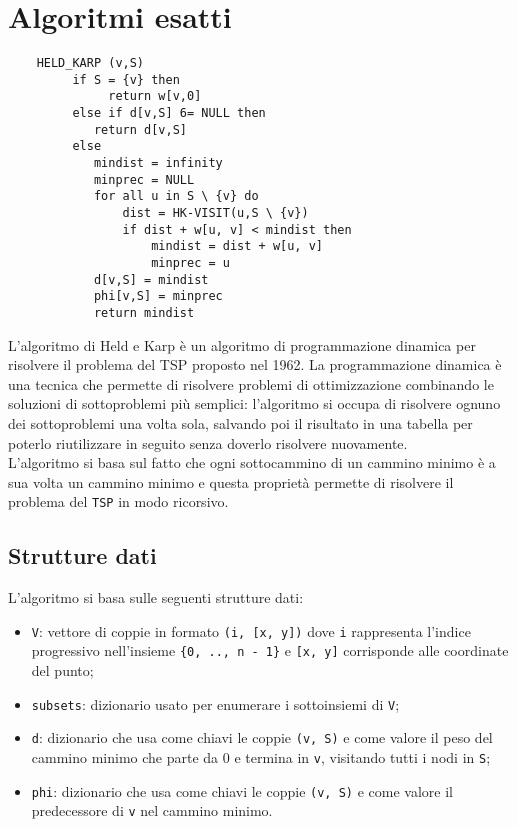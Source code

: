 \section{Algoritmi esatti}\label{held_karp}
\begin{lstlisting}
	HELD_KARP (v,S)
		 if S = {v} then
		 	  return w[v,0]   
		 else if d[v,S] 6= NULL then
		 	return d[v,S]
		 else
		 	mindist = infinity
		 	minprec = NULL
		 	for all u in S \ {v} do 
		 		dist = HK-VISIT(u,S \ {v})
		 		if dist + w[u, v] < mindist then
		 			mindist = dist + w[u, v]
		 			minprec = u
		 	d[v,S] = mindist
		 	phi[v,S] = minprec  
		 	return mindist                      
\end{lstlisting}

L’algoritmo di Held e Karp è un algoritmo di programmazione dinamica per risolvere il problema del TSP proposto nel 1962. La programmazione dinamica è una tecnica che permette di risolvere problemi di ottimizzazione
combinando le soluzioni di sottoproblemi più semplici: l'algoritmo si occupa di risolvere ognuno dei sottoproblemi una volta sola, salvando poi il risultato in una tabella per poterlo riutilizzare in seguito senza doverlo risolvere nuovamente. \\
L'algoritmo si basa sul fatto che ogni sottocammino di un cammino minimo è a sua volta un cammino minimo e questa proprietà permette di risolvere il problema del \texttt{TSP} in modo ricorsivo.

\subsection{Strutture dati}
L'algoritmo si basa sulle seguenti strutture dati:
\begin{itemize}
	\item \texttt{V}: vettore di coppie in formato \texttt{(i, [x, y])} dove \texttt{i} rappresenta l'indice progressivo nell'insieme \texttt{\{0, .., n - 1\}} e \texttt{[x, y]} corrisponde alle coordinate del punto;
	\item \texttt{subsets}: dizionario usato per enumerare i sottoinsiemi di \texttt{V};
	\item \texttt{d}: dizionario che usa come chiavi le coppie \texttt{(v, S)} e come valore il peso del cammino minimo che parte da 0 e termina in \texttt{v}, visitando tutti i nodi in \texttt{S};
	\item \texttt{phi}: dizionario che usa come chiavi le coppie \texttt{(v, S)} e come valore il predecessore di \texttt{v} nel cammino minimo.
\end{itemize}



